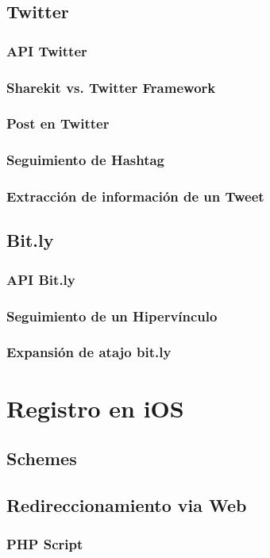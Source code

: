 	\subsection{Twitter}
		\subsubsection{API Twitter}
		\subsubsection{Sharekit vs. Twitter Framework}
		\subsubsection{Post en Twitter}
		\subsubsection{Seguimiento de Hashtag}
		\subsubsection{Extracción de información de un Tweet}
	\subsection{Bit.ly}
		\subsubsection{API Bit.ly}
		\subsubsection{Seguimiento de un Hipervínculo}
		\subsubsection{Expansión de atajo bit.ly}
\clearpage
\section{Registro en iOS}
	\subsection{Schemes}
	\subsection{Redireccionamiento via Web}
		\subsubsection{PHP Script}
